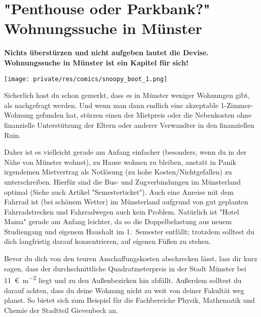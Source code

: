 \section[\texorpdfstring{"Penthouse oder Parkbank?"}{„Penthouse oder Parkbank?“} Wohnungssuche in Münster]{"Penthouse oder Parkbank?"\\Wohnungssuche in Münster}
\begin{multicols*}{2}
\textbf{Nichts überstürzen und nicht aufgeben lautet die Devise.
Wohnungssuche in Münster ist ein Kapitel für sich!}

\begin{center}
	\texttt{[image: private/res/comics/snoopy\_boot\_1.png]}
\end{center}

Sicherlich hast du schon gemerkt, dass es in Münster weniger Wohnungen gibt, als nachgefragt werden.
Und wenn man dann endlich eine akzeptable 1-Zimmer-Wohnung gefunden hat, stürzen einen der Mietpreis oder die Nebenkosten ohne finanzielle Unterstützung der Eltern oder anderer Verwandter in den finanziellen Ruin.

Daher ist es vielleicht gerade am Anfang einfacher (besonders, wenn du in der Nähe von Münster wohnst), zu Hause wohnen zu bleiben, anstatt in Panik irgendeinen Mietvertrag als Notlösung (zu hohe Kosten/Nichtgefallen) zu unterschreiben.
Hierfür sind die Bus- und Zugverbindungen im Münsterland optimal (Siehe auch Artikel "Semesterticket").
Auch eine Anreise mit dem Fahrrad ist (bei schönem Wetter) im Münsterland aufgrund von gut geplanten Fahrradstrecken und Fahrradwegen auch kein Problem.
Natürlich ist "Hotel Mama" gerade am Anfang leichter, da so die Doppelbelastung aus neuem Studiengang und eigenem Haushalt im 1.~Semester entfällt; trotzdem solltest du dich langfristig darauf konzentrieren, auf eigenen Füßen zu stehen.

Bevor du dich von den teuren Anschaffungskosten abschrecken lässt, lass dir kurz sagen, dass der durchschnittliche Quadratmeterpreis in der Stadt Münster bei \SI{11}{\euro\per\m\squared} liegt und zu den Außenbezirken hin abfällt.
Außerdem solltest du darauf achten, dass du deine Wohnung nicht zu weit von deiner Fakultät weg planst.
So bietet sich zum Beispiel für die Fachbereiche Physik, Mathematik und Chemie der Stadtteil Gievenbeck an.


\end{multicols*}
